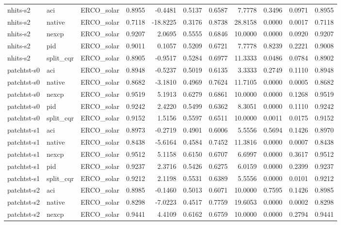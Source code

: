 \begin{tabular}{lllrrrrrrrr}
nhits-s2 & aci & ERCO_solar & 0.8955 & -0.4481 & 0.5137 & 0.6587 & 7.7778 & 0.3496 & 0.0971 & 0.8955 \\
nhits-s2 & native & ERCO_solar & 0.7118 & -18.8225 & 0.3176 & 0.8738 & 28.8158 & 0.0000 & 0.0017 & 0.7118 \\
nhits-s2 & nexcp & ERCO_solar & 0.9207 & 2.0695 & 0.5555 & 0.6846 & 10.0000 & 0.0000 & 0.0920 & 0.9207 \\
nhits-s2 & pid & ERCO_solar & 0.9011 & 0.1057 & 0.5209 & 0.6721 & 7.7778 & 0.8239 & 0.2221 & 0.9008 \\
nhits-s2 & split_cqr & ERCO_solar & 0.8905 & -0.9517 & 0.5284 & 0.6977 & 11.3333 & 0.0486 & 0.0784 & 0.8902 \\
patchtst-s0 & aci & ERCO_solar & 0.8948 & -0.5237 & 0.5019 & 0.6135 & 3.3333 & 0.2749 & 0.1110 & 0.8948 \\
patchtst-s0 & native & ERCO_solar & 0.8682 & -3.1810 & 0.4969 & 0.7624 & 11.7105 & 0.0000 & 0.0005 & 0.8682 \\
patchtst-s0 & nexcp & ERCO_solar & 0.9519 & 5.1913 & 0.6279 & 0.6861 & 10.0000 & 0.0000 & 0.1268 & 0.9519 \\
patchtst-s0 & pid & ERCO_solar & 0.9242 & 2.4220 & 0.5499 & 0.6362 & 8.3051 & 0.0000 & 0.1110 & 0.9242 \\
patchtst-s0 & split_cqr & ERCO_solar & 0.9152 & 1.5156 & 0.5597 & 0.6511 & 10.0000 & 0.0011 & 0.0175 & 0.9152 \\
patchtst-s1 & aci & ERCO_solar & 0.8973 & -0.2719 & 0.4901 & 0.6006 & 5.5556 & 0.5694 & 0.1426 & 0.8970 \\
patchtst-s1 & native & ERCO_solar & 0.8438 & -5.6164 & 0.4584 & 0.7452 & 11.3816 & 0.0000 & 0.0007 & 0.8438 \\
patchtst-s1 & nexcp & ERCO_solar & 0.9512 & 5.1158 & 0.6150 & 0.6707 & 6.6997 & 0.0000 & 0.3617 & 0.9512 \\
patchtst-s1 & pid & ERCO_solar & 0.9237 & 2.3716 & 0.5426 & 0.6275 & 6.0159 & 0.0000 & 0.2399 & 0.9237 \\
patchtst-s1 & split_cqr & ERCO_solar & 0.9212 & 2.1198 & 0.5531 & 0.6389 & 5.5556 & 0.0000 & 0.0101 & 0.9212 \\
patchtst-s2 & aci & ERCO_solar & 0.8985 & -0.1460 & 0.5013 & 0.6071 & 10.0000 & 0.7595 & 0.1426 & 0.8985 \\
patchtst-s2 & native & ERCO_solar & 0.8298 & -7.0223 & 0.4517 & 0.7759 & 19.6053 & 0.0000 & 0.0002 & 0.8298 \\
patchtst-s2 & nexcp & ERCO_solar & 0.9441 & 4.4109 & 0.6162 & 0.6759 & 10.0000 & 0.0000 & 0.2794 & 0.9441 \\

\end{tabular}
